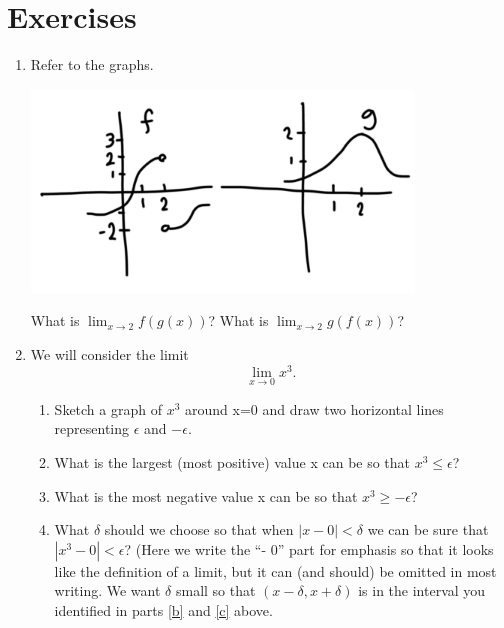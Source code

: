 \documentclass[11pt]{book}
\numberwithin{example}{chapter}
\begin{document}
\section{Exercises}

\begin{enumerate}

\item
Refer to the graphs.

\begin{center}
\includegraphics[width=4in]{limitExerciseImage1.png}
\end{center}

What is $\lim_{x\to 2} f(g(x))$?  What is $\lim_{x\to 2} g(f(x))$?




\item 

We will consider the limit $$\lim_{x\to 0} x^3.$$ 

\begin{enumerate}
\item 
Sketch a graph of $x^3$ around x=0 and draw two horizontal lines representing $\epsilon$ and $-\epsilon$. 



\item \label{b}
 What is the largest (most positive) value x can be so that   $x^3\leq \epsilon$?  
 

 
 \item \label{c}
  What is the most negative value x can be so that $x^3\geq -\epsilon$?



\item
What $\delta$ should we choose so that when $|x-0|<\delta$ we can be sure that $|x^3-0|<\epsilon$?  (Here we write the ``- 0'' part for emphasis so that it looks like the definition of a limit, but it can (and should) be omitted in most writing.  We want $\delta$ small so that $(x-\delta,x+\delta)$ is in the interval you identified in parts \ref{b} and \ref{c} above.




\end{enumerate}
\end{enumerate}
\end{document}
